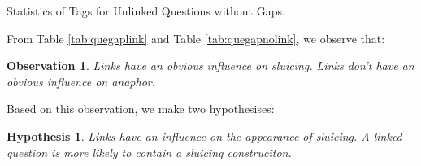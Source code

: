 \documentclass[bsc,frontabs,twoside,singlespacing,parskip,deptreport]{infthesis}     %
\newtheorem{observation}{Observation}[chapter]
\newtheorem{hypo}{Hypothesis}[chapter]
\begin{document}
\begin{minipage}{\textwidth}
\begin{minipage}[t]{0.45\textwidth}
\caption{Statistics of Tags for Unlinked Questions without Gaps.}
\label{tab:quegapnolink}

        \end{minipage}
    \end{minipage}


From Table \ref{tab:quegaplink} and Table \ref{tab:quegapnolink}, we observe that:

\begin{observation}
Links have an obvious influence on sluicing. Links don't have an obvious influence on anaphor.
\end{observation}

Based on this observation, we make two hypothesises:

\begin{hypo}
Links have an influence on the appearance of sluicing. A linked question is more likely to contain a sluicing construciton.
\end{hypo}
\end{document}
